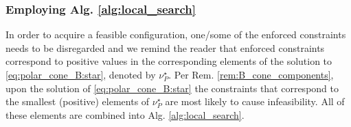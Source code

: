 \documentclass[letterpaper, 10 pt, conference]{ieeeconf}  %
\begin{document}
{%


\subsubsection{\textbf{Employing Alg. \ref{alg:local_search}}}
In order to acquire a feasible configuration, one/some of the enforced constraints needs to be disregarded and we remind the reader that enforced constraints correspond to positive values in the corresponding elements of the solution to \eqref{eq:polar_cone_B:star}, denoted by $\nu_P^\star$. Per Rem. \ref{rem:B_cone_components}, upon the solution of \eqref{eq:polar_cone_B:star} the constraints that correspond to the smallest (positive) elements of $\nu_P^\star$ are most likely to cause infeasibility. 
All of these elements are combined into Alg. \ref{alg:local_search}.
}
\end{document}
